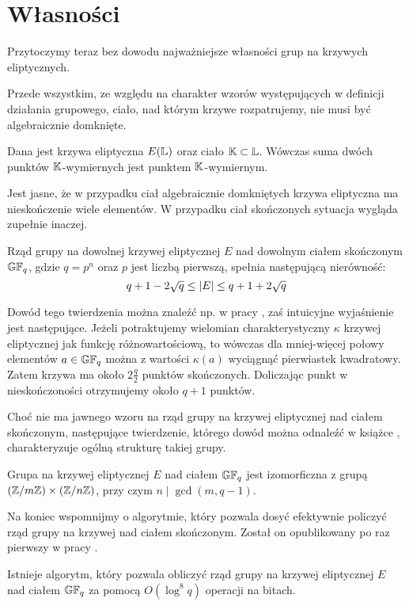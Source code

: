 \section{Własności}

Przytoczymy teraz bez dowodu najważniejsze własności
grup na krzywych eliptycznych.

Przede wszystkim, ze względu na charakter wzorów występujących
w definicji działania grupowego,
ciało, nad którym krzywe rozpatrujemy, nie musi być algebraicznie domknięte.

\begin{fact}
Dana jest krzywa eliptyczna $E(\mathbb{L})$ oraz ciało $\mathbb{K} \subset \mathbb{L}$.
Wówczas suma dwóch punktów $\mathbb{K}$-wymiernych jest punktem $\mathbb{K}$-wymiernym.
\end{fact}

Jest jasne, że w przypadku ciał algebraicznie domkniętych krzywa eliptyczna
ma nieskończenie wiele elementów.
W przypadku ciał skończonych sytuacja wygląda zupełnie inaczej.

\begin{theorem}[Hasse]
Rząd grupy na dowolnej krzywej eliptycznej $E$
nad dowolnym ciałem skończonym $\mathbb{GF}_q$,
gdzie $q = p^n$ oraz $p$ jest liczbą pierwszą,
spełnia następującą nierówność:
\begin{equation}
q + 1 - 2\sqrt{q} \leq \lvert E\rvert \leq q + 1 + 2\sqrt{q}
\end{equation}
\end{theorem}

Dowód tego twierdzenia można znaleźć np. w pracy \cite{ecintro1},
zaś intuicyjne wyjaśnienie jest następujące.
Jeżeli potraktujemy wielomian charakterystyczny $\kappa$ krzywej eliptycznej
jak funkcję różnowartościową,
to wówczas dla mniej-więcej połowy elementów $a \in \mathbb{GF}_q$
można z wartości $\kappa(a)$ wyciągnąć pierwiastek kwadratowy.
Zatem krzywa ma około $2\frac{q}{2}$ punktów skończonych.
Doliczając punkt w nieskończoności otrzymujemy około $q + 1$ punktów.

Choć nie ma jawnego wzoru
na rząd grupy na krzywej eliptycznej nad ciałem skończonym,
następujące twierdzenie,
którego dowód można odnaleźć w książce \cite{silverman},
charakteryzuje ogólną strukturę takiej grupy.

\begin{theorem}\label{finite_curve_structure_theorem}
Grupa na krzywej eliptycznej $E$ nad ciałem $\mathbb{GF}_q$
jest izomorficzna z grupą $(\mathbb{Z}/m\mathbb{Z}) \times (\mathbb{Z}/n\mathbb{Z})$,
przy czym $n \mid \gcd(m, q-1)$.
\end{theorem}

Na koniec wspomnijmy o algorytmie,
który pozwala dosyć efektywnie policzyć
rząd grupy na krzywej nad ciałem skończonym.
Został on opublikowany po raz pierwszy w pracy \cite{schoof}.

\begin{theorem}[Schoof]
Istnieje algorytm, który pozwala obliczyć rząd grupy na krzywej eliptycznej $E$
nad ciałem $\mathbb{GF}_q$ za pomocą $O(\log^8 q)$ operacji na bitach.
\end{theorem}
